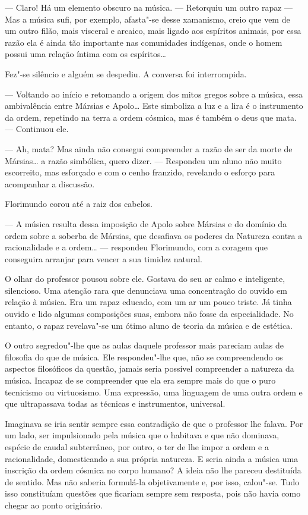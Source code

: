 --- Claro! Há um elemento obscuro na música. --- Retorquiu um outro rapaz ---
Mas a música sufi, por exemplo, afasta"-se desse xamanismo, creio que vem
de um outro filão, mais visceral e arcaico, mais ligado aos espíritos
animais, por essa razão ela é ainda tão importante nas comunidades
indígenas, onde o homem possui uma relação íntima com os espíritos\ldots{}

Fez"-se silêncio e alguém se despediu. A conversa foi interrompida.

--- Voltando ao início e retomando a origem dos mitos gregos sobre a
música, essa ambivalência entre Mársias e Apolo\ldots{} Este simboliza a
luz e a lira é o instrumento da ordem, repetindo na terra a ordem
cósmica, mas é também o deus que mata. --- Continuou ele.

--- Ah, mata? Mas ainda não consegui compreender a razão de ser da morte
de Mársias\ldots{} a razão simbólica, quero dizer. --- Respondeu um aluno não
muito escorreito, mas esforçado e com o cenho franzido, revelando o
esforço para acompanhar a discussão.

Florimundo corou até a raiz dos cabelos.

--- A música resulta dessa imposição de Apolo sobre Mársias e do domínio
da ordem sobre a soberba de Mársias, que desafiava os poderes da
Natureza contra a racionalidade e a ordem\ldots{} --- respondeu Florimundo, com
a coragem que conseguira arranjar para vencer a sua timidez natural.

O olhar do professor pousou sobre ele. Gostava do seu ar calmo e
inteligente, silencioso. Uma atenção rara que denunciava uma
concentração do ouvido em relação à música. Era um rapaz educado, com um
ar um pouco triste. Já tinha ouvido e lido algumas composições suas,
embora não fosse da especialidade. No entanto, o rapaz revelava"-se um
ótimo aluno de teoria da música e de estética.

O outro segredou"-lhe que as aulas daquele professor mais pareciam aulas
de filosofia do que de música. Ele respondeu"-lhe que, não se
compreendendo os aspectos filosóficos da questão, jamais seria possível
compreender a natureza da música. Incapaz de se compreender que ela era
sempre mais do que o puro tecnicismo ou virtuosismo. Uma expressão, uma
linguagem de uma outra ordem e que ultrapassava todas as técnicas e
instrumentos, universal.

Imaginava se iria sentir sempre essa contradição de que o professor lhe
falava. Por um lado, ser impulsionado pela música que o habitava e que
não dominava, espécie de caudal subterrâneo, por outro, o ter de lhe
impor a ordem e a racionalidade, domesticando a sua própria natureza. E
seria ainda a música uma inscrição da ordem cósmica no corpo humano? A
ideia não lhe pareceu destituída de sentido. Mas não saberia formulá-la
objetivamente e, por isso, calou"-se. Tudo isso constituíam questões que
ficariam sempre sem resposta, pois não havia como chegar ao ponto
originário.

